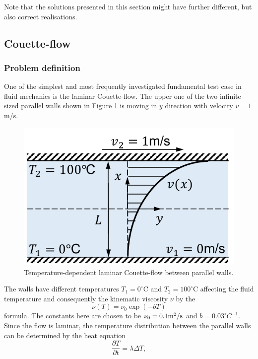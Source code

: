 \documentclass[a4paper,12pt,openany]{book}
\theoremstyle{break}
\begin{document}
Note that the solutions presented in this section might have further different, but also correct realisations.
\subsection{Couette-flow}
\subsubsection{Problem definition}
One of the simplest and most frequently investigated fundamental test case in fluid mechanics is the laminar Couette-flow. The upper one of the two infinite sized parallel walls shown in Figure \ref{fig:couette} is moving in $y$ direction with velocity $v=1$m/s.
\begin{figure}[H]
  \includegraphics[scale=0.7]{couette.pdf}
  \centering
  \caption{Temperature-dependent laminar Couette-flow between parallel walls.}
  \label{fig:couette}
\end{figure}\vspace*{3pt}
The walls have different temperatures $T_1=0^\circ$C and $T_2=100^\circ$C affecting the fluid temperature and consequently the kinematic viscosity $\nu$ by the
\begin{equation}
\nu(T)=\nu_0 \exp(-bT)
\end{equation}
formula. The constants here are chosen to be $\nu_0=0.1\rm{m}^2/\rm s$ and $b=0.03 ^\circ C^{-1}$. Since the flow is laminar, the temperature distribution between the parallel walls can be determined by the heat equation
\begin{equation} \label{eq:couette_laplace}
\frac{\partial T}{\partial t}=\lambda\Delta T,
\end{equation}
\end{document}
